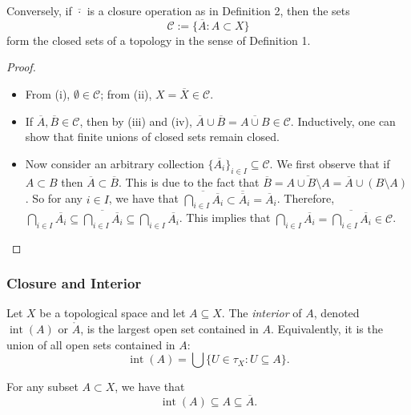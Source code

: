 \begin{proposition}
Conversely, if \(\overline{\cdot}\) is a closure operation as in Definition 2, then the sets
\[
\mathcal{C} := \{\overline{A} : A \subset X\}
\]
form the closed sets of a topology in the sense of Definition 1.
\end{proposition}

\begin{proof}
\begin{itemize}
  \item[(a)] From (i), \(\emptyset \in \mathcal{C}\); from (ii), \(X = \overline{X} \in \mathcal{C}\).
  \item[(b)] If \(\overline{A},\overline{B} \in \mathcal{C}\), then by (iii) and (iv), \(\overline{A} \cup \overline{B} = \overline{A \cup B} \in \mathcal{C}\). Inductively, one can show that finite unions of closed sets remain closed.
  \item[(c)] Now consider an arbitrary collection \(\{\overline{A_i}\}_{i \in I} \subseteq \mathcal{C}\). We first observe that if $A\subset B$ then $\overline{A}\subset \overline{B}$. This is due to the fact that $\overline{B}=\overline{A\cup B\setminus A}=\overline{A}\cup (B\setminus A)$. So for any $i\in I$, we have that $\overline{\bigcap_{i\in I} \overline{A_i}}\subset\overline{\overline{A}}_i=\overline{A}_i $. Therefore, \(\bigcap_{i\in I} \overline{A_i}\subseteq\overline{\bigcap_{i\in I} \overline{A_i}} \subseteq \bigcap_{i\in I} \overline{A_i}\). This implies that \(\bigcap_{i\in I} \overline{A_i} = \overline{\bigcap_{i\in I} \overline{A_i}} \in \mathcal{C}\).
\end{itemize}
\end{proof}

\subsubsection{Closure and Interior}

\begin{definition}[Interior]
Let \(X\) be a topological space and let \(A \subseteq X\). The \emph{interior} of \(A\), denoted \(\operatorname{int}(A)\) or \(\mathring{A}\), is the largest open set contained in \(A\). Equivalently, it is the union of all open sets contained in \(A\):
\[
\operatorname{int}(A) = \bigcup \{U \in \tau_X : U \subseteq A\}.
\]
\end{definition}

\begin{remark}
  For any subset $A\subset X$, we have that 
  \[
  \operatorname{int}(A) \subseteq A\subseteq \overline{A}.
  \]
\end{remark}

